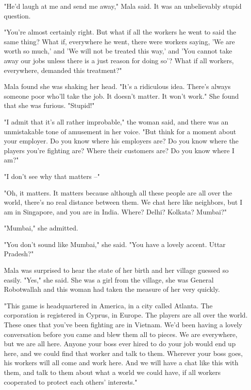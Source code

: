 "He'd laugh at me and send me away," Mala said. It was an
unbelievably stupid question.

"You're almost certainly right. But what if all the workers he went
to said the same thing? What if, everywhere he went, there were
workers saying, 'We are worth so much,' and 'We will not be treated
this way,' and 'You cannot take away our jobs unless there is a
just reason for doing so'? What if all workers, everywhere,
demanded this treatment?"

Mala found she was shaking her head. "It's a ridiculous idea.
There's always someone poor who'll take the job. It doesn't matter.
It won't work." She found that she was furious. "Stupid!"

"I admit that it's all rather improbable," the woman said, and
there was an unmistakable tone of amusement in her voice. "But
think for a moment about your employer. Do you know where his
employers are? Do you know where the players you're fighting are?
Where their customers are? Do you know where I am?"

"I don't see why that matters --"

"Oh, it matters. It matters because although all these people are
all over the world, there's no real distance between them. We chat
here like neighbors, but I am in Singapore, and you are in India.
Where? Delhi? Kolkata? Mumbai?"

"Mumbai," she admitted.

"You don't sound like Mumbai," she said. "You have a lovely accent.
Uttar Pradesh?"

Mala was surprised to hear the state of her birth and her village
guessed so easily. "Yes," she said. She was a girl from the
village, she was General Robotwallah and this woman had taken the
measure of her very quickly.

"This game is headquartered in America, in a city called Atlanta.
The corporation is registered in Cyprus, in Europe. The players are
all over the world. These ones that you've been fighting are in
Vietnam. We'd been having a lovely conversation before you came and
blew them all to pieces. We are everywhere, but we are all here.
Anyone your boss ever hired to do your job would end up here, and
we could find that worker and talk to them. Wherever your boss
goes, his workers will all come and work here. And we will have a
chat like this with them, and talk to them about what a world we
could have, if all workers cooperated to protect each others'
interests."

